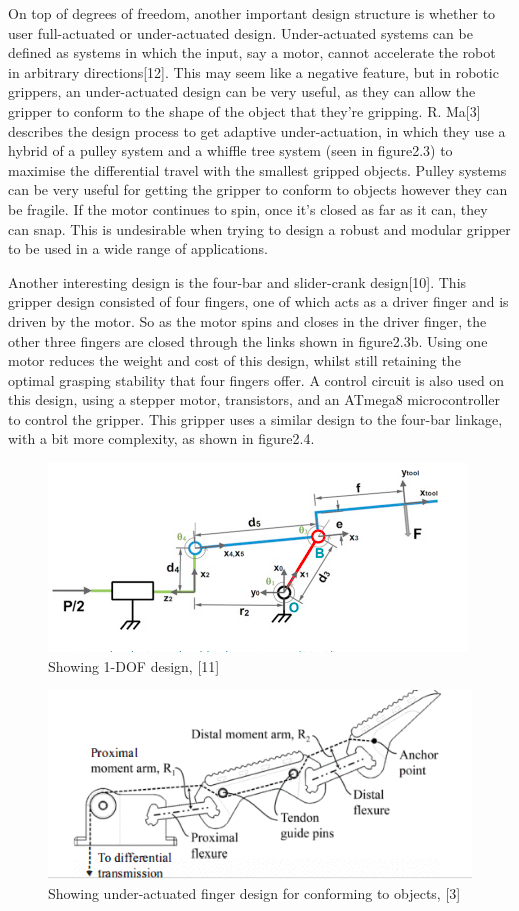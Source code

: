 \documentclass{l4proj}
\begin{document}
On top of degrees of freedom, another important design structure is whether to user full-actuated or under-actuated design. Under-actuated systems can be defined as systems in which the input, say a motor, cannot accelerate the robot in arbitrary directions[12]. This may seem like a negative feature, but in robotic grippers, an under-actuated design can be very useful, as they can allow the gripper to conform to the shape of the object that they're gripping. R. Ma[3] describes the design process to get adaptive under-actuation, in which they use a hybrid of a pulley system and a whiffle tree system (seen in figure2.3) to maximise the differential travel with the smallest gripped objects. Pulley systems can be very useful for getting the gripper to conform to objects however they can be fragile. If the motor continues to spin, once it's closed as far as it can, they can snap. This is undesirable when trying to design a robust and modular gripper to be used in a wide range of applications. 

Another interesting design is the four-bar and slider-crank design[10]. This gripper design consisted of four fingers, one of which acts as a driver finger and is driven by the motor. So as the motor spins and closes in the driver finger, the other three fingers are closed through the links shown in figure2.3b. Using one motor reduces the weight and cost of this design, whilst still retaining the optimal grasping stability that four fingers offer. A control circuit is also used on this design, using a stepper motor, transistors, and an ATmega8 microcontroller to control the gripper. This gripper uses a similar design to the four-bar linkage, with a bit more complexity, as shown in figure2.4.


\begin{figure}[!ht]
  \centering
  \includegraphics[width=0.75\linewidth]{images/image1.png}   
  \caption{Showing 1-DOF design, [11]}
  \label{fig:image1} 
\end{figure}

\begin{figure}[!ht]
  \centering
  \includegraphics[width=0.75\linewidth]{images/image2.png}   
  \caption{Showing under-actuated finger design for conforming to objects, [3]}
\end{figure}
\end{document}
